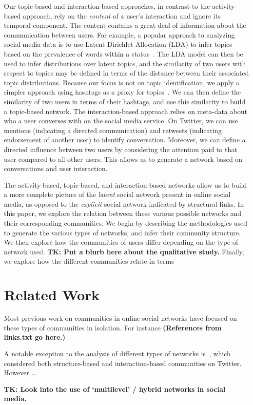 \documentclass[letterpaper]{article}
\begin{document}
Our topic-based and interaction-based approaches, in contrast to the activity-based approach, rely on the \emph{content} of a user's interaction and ignore its temporal component. The content contains a great deal of information about the communication between users. For example, a popular approach to analyzing social media data is to use Latent Dirichlet Allocation (LDA) to infer topics based on the prevalence of words within a status~\cite{zhao2011comparing,michelson2010discovering}. The LDA model can then be used to infer distributions over latent topics, and the similarity of two users with respect to topics may be defined in terms of the distance between their associated topic distributions. Because our focus is not on topic identification, we apply a simpler approach using hashtags as a proxy for topics~\cite{becker2011beyond,tsur2012s}. We can then define the similarity of two users in terms of their hashtags, and use this similarity to build a topic-based network. The interaction-based approach relies on meta-data about who a user converses with on the social media service. On Twitter, we can use mentions (indicating a directed communication) and retweets (indicating endorsement of another user) to identify conversation. Moreover, we can define a directed influence between two users by considering the attention paid to that user compared to all other users. This allows us to generate a network based on conversations and user interaction.

The activity-based, topic-based, and interaction-based networks allow us to build a more complete picture of the \emph{latent} social network present in online social media, as opposed to the \emph{explicit} social network indicated by structural links. In this paper, we explore the relation between these various possible networks and their corresponding communities. We begin by describing the methodologies used to generate the various types of networks, and infer their community structure. We then explore how the communities of users differ depending on the type of network used. \textbf{TK: Put a blurb here about the qualitative study.} Finally, we explore how the different communities relate in terms 

\section{Related Work}

Most previous work on communities in online social networks have focused on these types of communities in isolation. For instance \textbf{(References from links.txt go here.)}

A notable exception to the analysis of different types of networks is~\cite{lim2012tweets}, which considered both structure-based and interaction-based communities on Twitter. However ... 

\textbf{TK: Look into the use of `multilevel' / hybrid networks in social media.}
\end{document}
